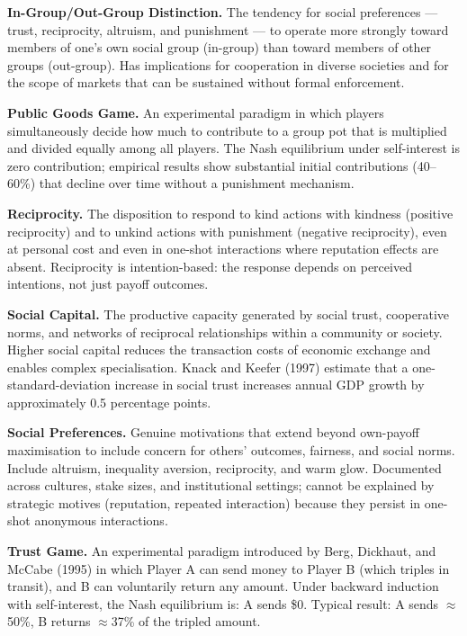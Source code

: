 \documentclass[12pt, letterpaper]{article}
\begin{document}
\textbf{In-Group/Out-Group Distinction.} The tendency for social preferences --- trust, reciprocity, altruism, and punishment --- to operate more strongly toward members of one's own social group (in-group) than toward members of other groups (out-group). Has implications for cooperation in diverse societies and for the scope of markets that can be sustained without formal enforcement.

\textbf{Public Goods Game.} An experimental paradigm in which players simultaneously decide how much to contribute to a group pot that is multiplied and divided equally among all players. The Nash equilibrium under self-interest is zero contribution; empirical results show substantial initial contributions (40--60\%) that decline over time without a punishment mechanism.

\textbf{Reciprocity.} The disposition to respond to kind actions with kindness (positive reciprocity) and to unkind actions with punishment (negative reciprocity), even at personal cost and even in one-shot interactions where reputation effects are absent. Reciprocity is intention-based: the response depends on perceived intentions, not just payoff outcomes.

\textbf{Social Capital.} The productive capacity generated by social trust, cooperative norms, and networks of reciprocal relationships within a community or society. Higher social capital reduces the transaction costs of economic exchange and enables complex specialisation. Knack and Keefer (1997) estimate that a one-standard-deviation increase in social trust increases annual GDP growth by approximately 0.5 percentage points.

\textbf{Social Preferences.} Genuine motivations that extend beyond own-payoff maximisation to include concern for others' outcomes, fairness, and social norms. Include altruism, inequality aversion, reciprocity, and warm glow. Documented across cultures, stake sizes, and institutional settings; cannot be explained by strategic motives (reputation, repeated interaction) because they persist in one-shot anonymous interactions.

\textbf{Trust Game.} An experimental paradigm introduced by Berg, Dickhaut, and McCabe (1995) in which Player A can send money to Player B (which triples in transit), and B can voluntarily return any amount. Under backward induction with self-interest, the Nash equilibrium is: A sends \$0. Typical result: A sends $\approx$50\%, B returns $\approx$37\% of the tripled amount.
\end{document}
